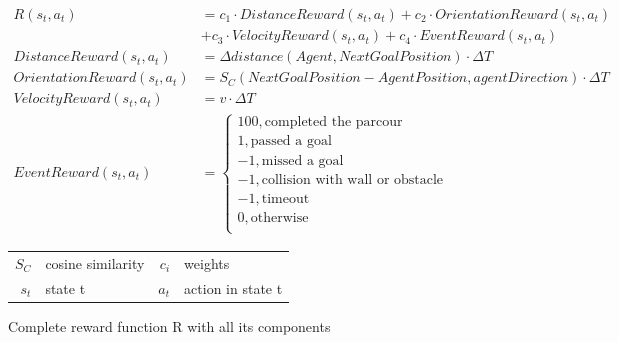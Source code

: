 \begin{figure}
    \centering
    \begin{align}
        R(s_t,a_t)                 & = c_1 \cdot DistanceReward(s_t,a_t) + c_2 \cdot OrientationReward(s_t,a_t) \nonumber \\
                                   & + c_3 \cdot VelocityReward(s_t, a_t) + c_4 \cdot EventReward(s_t, a_t) \nonumber     \\
        DistanceReward(s_t,a_t)    & = \Delta distance(Agent, NextGoalPosition) \cdot \Delta T \nonumber                  \\
        OrientationReward(s_t,a_t) & = S_C(NextGoalPosition - AgentPosition, agentDirection) \cdot \Delta T \nonumber     \\
        VelocityReward(s_t, a_t)   & = v \cdot \Delta T \nonumber                                                         \\
        EventReward(s_t, a_t)      & = \begin{cases}
                                           100,           \text{completed the parcour}           \\
                                           1,             \text{passed a goal}                   \\
                                           -1,            \text{missed a goal}                   \\
                                           -1,            \text{collision with wall or obstacle} \\
                                           -1,            \text{timeout}                         \\
                                           0,             \text{otherwise}                       \\
                                       \end{cases} \nonumber
    \end{align}
    \caption{Complete reward function R with all its components}
    \begin{tabular}{r@{: }l r@{: }l}
        $S_C$ & cosine similarity & $c_i$ & weights           \\
        $s_t$ & state t           & $a_t$ & action in state t
    \end{tabular}
    \label{fig:reward_functions}
\end{figure}



